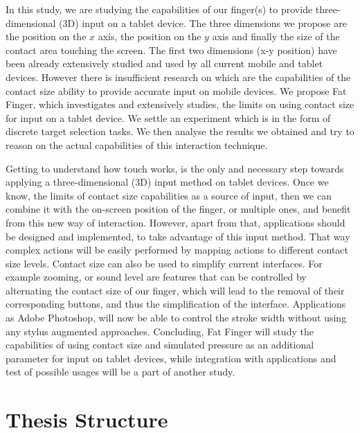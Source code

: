 In this study, we are studying the capabilities of our finger(s) to provide three-dimensional (3D) input on a tablet device. The three dimensions we propose  are the position on the $x$ axis, the position on the $y$ axis and finally the size of the contact area touching the screen. The first two dimensions (x-y position) have been already extensively studied and used by all current mobile and tablet devices. However there is insufficient research on which are the capabilities of the contact size ability to provide accurate input on mobile devices. We propose Fat Finger, which investigates and extensively studies, the limits on using contact size for input on a tablet device. We settle an experiment which is in the form of discrete target selection tasks. We then analyse the results we obtained and try to reason on the actual capabilities of this interaction technique.

Getting to understand how touch works, is the only and necessary step towards applying a three-dimensional (3D) input method on tablet devices. Once we know, the limits of contact size capabilities as a source of input, then we can combine it with the on-screen position of the finger, or multiple ones, and benefit from this new way of interaction. However, apart from that, applications should be designed and implemented, to take advantage of this input method. That way complex actions will be easily performed by mapping actions to different contact size levels. 
Contact size can also be used to simplify current interfaces. For example zooming, or sound level are features that can be controlled by alternating the contact size of our finger, which will lead to the removal of their corresponding buttons, and thus the simplification of the interface. Applications as Adobe Photoshop, will now be able to control the stroke width without using any stylus augmented approaches. Concluding, Fat Finger will study the capabilities of using contact size and simulated pressure as an additional parameter for input on tablet devices, while integration with applications and test of possible usages will be a part of another study.



\section{Thesis Structure}

